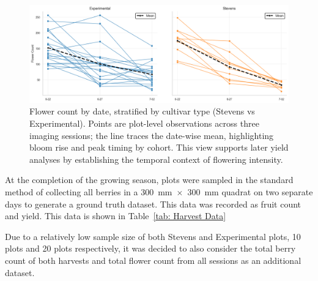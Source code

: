 

\begin{figure}[H]
    \centering
    \includegraphics[width=0.85\linewidth]{images/Count by Type vs Date.png}
    \caption{Flower count by date, stratified by cultivar type (Stevens vs Experimental). Points are plot-level observations across three imaging sessions; the line traces the date-wise mean, highlighting bloom rise and peak timing by cohort. This view supports later yield analyses by establishing the temporal context of flowering intensity.}
    \label{fig:Count by Type vs Date}
\end{figure}

At the completion of the growing season, plots were sampled in the standard method of collecting all berries in a 300~mm~$\times$~300~mm quadrat on two separate days to generate a ground truth dataset. This data was recorded as fruit count and yield. This data is shown in Table~\ref{tab: Harvest Data}



Due to a relatively low sample size of both Stevens and Experimental plots, 10 plots and 20 plots respectively, it was decided to also consider the total berry count of both harvests and total flower count from all sessions as an additional dataset. 


